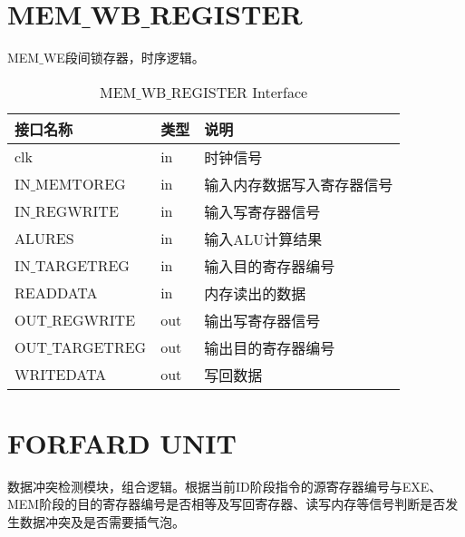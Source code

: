 \section{MEM$\_$WB$\_$REGISTER}

MEM$\_$WE段间锁存器，时序逻辑。

\begin{table}[H]
\begin{center}
\renewcommand{\arraystretch}{1.3}
\small
\caption{MEM$\_$WB$\_$REGISTER Interface}
\label{tab:treatments}
\begin{tabular}{|p{3cm}<{\centering}|p{1.4cm}<{\centering}|p{7cm}<{\centering}|}
\hline
接口名称 & 类型 & 说明 \\
\hline
clk & in & 时钟信号 \\
\hline
IN$\_$MEMTOREG & in & 输入内存数据写入寄存器信号 \\
\hline
IN$\_$REGWRITE & in & 输入写寄存器信号 \\
\hline
ALURES & in & 输入ALU计算结果 \\
\hline
IN$\_$TARGETREG & in & 输入目的寄存器编号 \\
\hline
READDATA & in & 内存读出的数据 \\
\hline
OUT$\_$REGWRITE & out & 输出写寄存器信号 \\
\hline
OUT$\_$TARGETREG & out & 输出目的寄存器编号 \\
\hline
WRITEDATA & out & 写回数据 \\
\hline
\end{tabular}
\end{center}
\end{table}


\section{FORFARD UNIT}

数据冲突检测模块，组合逻辑。根据当前ID阶段指令的源寄存器编号与EXE、MEM阶段的目的寄存器编号是否相等及写回寄存器、读写内存等信号判断是否发生数据冲突及是否需要插气泡。

